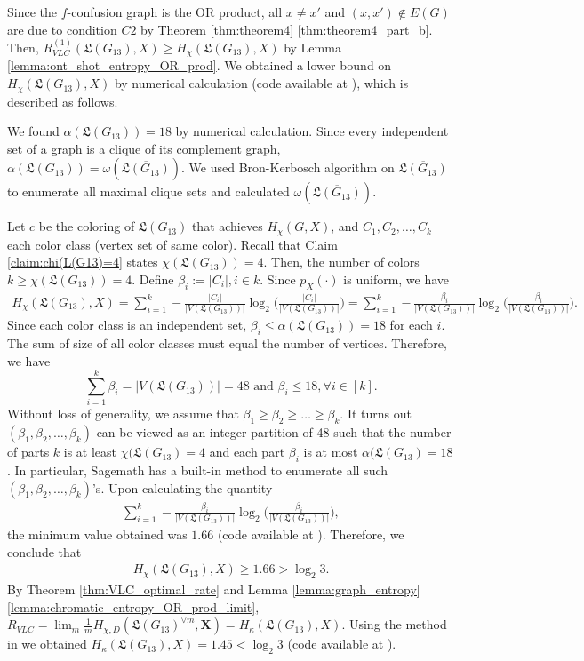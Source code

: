 \documentclass[journal, onecolumn, draftcls]{IEEEtran}
\theoremstyle{definition}
\newcommand{\bfX}{\mathbf{X}}
\newcommand{\frL}{\mathfrak{L}}
\begin{document}
Since the $f$-confusion graph is the OR product, all $x\ne x'$ and $(x,x')\notin E(G)$ are due to condition $C2$ by Theorem \ref{thm:theorem4} \ref{thm:theorem4_part_b}. Then,  $R_{VLC}^{(1)}(\frL(G_{13}),X)\ge H_{\chi}(\frL(G_{13}),X)$ by Lemma \ref{lemma:ont_shot_entropy_OR_prod}. We obtained a lower bound on $H_{\chi}(\frL(G_{13}),X)$ by numerical calculation (code available at \cite{meng2024github}), which is described as follows.  

We found $\alpha(\frL(G_{13}))=18$  by numerical calculation. Since every independent set of a graph is a clique of its complement graph, $\alpha(\frL(G_{13}))= \omega(\overline{\frL(G_{13})})$. We used Bron-Kerbosch algorithm \cite{BronKerbosch73} on $\overline{\frL(G_{13})}$ to enumerate all maximal clique sets and calculated $\omega(\overline{\frL(G_{13})})$. 

 Let $c$ be the coloring of  $\frL(G_{13})$ that achieves $H_{\chi}(G,X)$, and $C_1,C_2,\dots, C_k$ each color class (vertex set of same color). Recall that Claim \ref{claim:chi(L(G13)=4} states $\chi(\frL(G_{13})) = 4$. Then, the number of colors  $k\ge \chi(\frL(G_{13}))=4$.  Define  $\beta_i:=|C_i|,i\in k$. Since $p_X(\cdot)$ is uniform, we have 
\begin{align*}
  H_{\chi}(\frL(G_{13}),X)= \sum_{i=1}^k - \frac{|C_i|}{|V(\frL(G_{13}))|} \log_2 \Big  (\frac{|C_i|}{|V(\frL(G_{13}))|}\Big  )= \sum_{i=1}^k - \frac{\beta_i}{|V(\frL(G_{13}))|} \log_2 \Big (\frac{\beta_i}{|V(\frL(G_{13}))|}\Big ).
\end{align*} 
Since each color class is an independent set, $\beta_i\le \alpha(\frL(G_{13})) = 18$ for each $i$. The sum of size of all color classes must equal the number of vertices.  Therefore, we have
\begin{equation}\label{eq:line_graph_color}
        \sum_{i=1}^k\beta_i=|V(\frL(G_{13}))| = 48\text{ and }\beta_i\le 18, \forall i\in[k].
\end{equation}
Without loss of generality, we assume that $\beta_1\ge \beta_2 \ge \dots \ge \beta_k$. It turns out $(\beta_1, \beta_2 , \dots , \beta_k)$ can be viewed as an integer partition of 48 such that the number of parts $k$ is at least $\chi(\frL(G_{13})=4$  and each part  $\beta_i$  is at most $\alpha(\frL(G_{13})=18$. In particular, Sagemath has a built-in method to enumerate all such $(\beta_1, \beta_2 , \dots , \beta_k)$'s. Upon calculating the quantity 
\begin{align*}
    \sum_{i=1}^k - \frac{\beta_i}{|V(\frL(G_{13}))|} \log_2 \Big (\frac{\beta_i}{|V(\frL(G_{13}))|}\Big ),
\end{align*}
the minimum value obtained was $1.66$ (code available at \cite{meng2024github}). Therefore, we conclude that 
\begin{align*}
     H_{\chi}(\frL(G_{13}),X)\ge 1.66>\log_2 3.
\end{align*}
 By Theorem \ref{thm:VLC_optimal_rate} and  Lemma \ref{lemma:graph_entropy} \ref{lemma:chromatic_entropy_OR_prod_limit}, $R_{VLC} = \lim_m\frac{1}{m} H_{\chi,D}(\frL(G_{13})^{\lor m},\bfX) = H_{\kappa}(\frL(G_{13}),X)$. Using the method in \cite{HarangiNB24} we obtained $H_{\kappa}(\frL(G_{13}),X) = 1.45 < \log_2 3$ (code available at \cite{meng2024github}).
   
\end{document}
